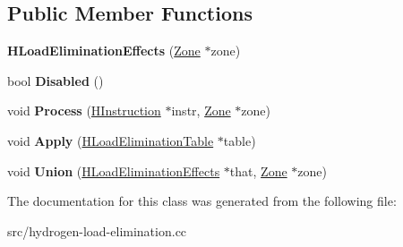 \subsection*{Public Member Functions}
\begin{DoxyCompactItemize}
\item 
\hypertarget{classv8_1_1internal_1_1_h_load_elimination_effects_a78b6820b2fdc4156cc2082a0761afc76}{}{\bfseries H\+Load\+Elimination\+Effects} (\hyperlink{classv8_1_1internal_1_1_zone}{Zone} $\ast$zone)\label{classv8_1_1internal_1_1_h_load_elimination_effects_a78b6820b2fdc4156cc2082a0761afc76}

\item 
\hypertarget{classv8_1_1internal_1_1_h_load_elimination_effects_a61fbae0d6ede77279eabd68e43002fc3}{}bool {\bfseries Disabled} ()\label{classv8_1_1internal_1_1_h_load_elimination_effects_a61fbae0d6ede77279eabd68e43002fc3}

\item 
\hypertarget{classv8_1_1internal_1_1_h_load_elimination_effects_a99dc0116f485f23ae600626a64968175}{}void {\bfseries Process} (\hyperlink{classv8_1_1internal_1_1_h_instruction}{H\+Instruction} $\ast$instr, \hyperlink{classv8_1_1internal_1_1_zone}{Zone} $\ast$zone)\label{classv8_1_1internal_1_1_h_load_elimination_effects_a99dc0116f485f23ae600626a64968175}

\item 
\hypertarget{classv8_1_1internal_1_1_h_load_elimination_effects_a8f16555266c0f6dbe2b11ea45ccdb996}{}void {\bfseries Apply} (\hyperlink{classv8_1_1internal_1_1_h_load_elimination_table}{H\+Load\+Elimination\+Table} $\ast$table)\label{classv8_1_1internal_1_1_h_load_elimination_effects_a8f16555266c0f6dbe2b11ea45ccdb996}

\item 
\hypertarget{classv8_1_1internal_1_1_h_load_elimination_effects_adbb84d299260a86fc02991022ab3a10b}{}void {\bfseries Union} (\hyperlink{classv8_1_1internal_1_1_h_load_elimination_effects}{H\+Load\+Elimination\+Effects} $\ast$that, \hyperlink{classv8_1_1internal_1_1_zone}{Zone} $\ast$zone)\label{classv8_1_1internal_1_1_h_load_elimination_effects_adbb84d299260a86fc02991022ab3a10b}

\end{DoxyCompactItemize}


The documentation for this class was generated from the following file\+:\begin{DoxyCompactItemize}
\item 
src/hydrogen-\/load-\/elimination.\+cc\end{DoxyCompactItemize}
